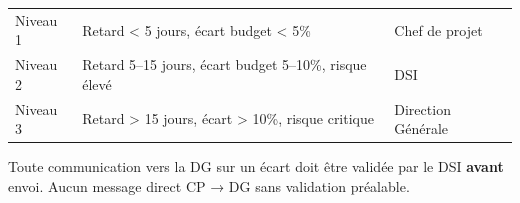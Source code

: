 \documentclass[11pt,a4paper,oneside]{report}
\begin{document}
\renewcommand{\arraystretch}{1.3}
\begin{tabularx}{\textwidth}{L{3cm} Y L{4cm}}
\toprule
{} &  &  \\
\midrule
Niveau 1 & Retard \textless{} 5 jours, écart budget \textless{} 5\% & Chef de projet \\
Niveau 2 & Retard 5–15 jours, écart budget 5–10\%, risque élevé & DSI \\
Niveau 3 & Retard \textgreater{} 15 jours, écart \textgreater{} 10\%, risque critique & Direction Générale \\
\bottomrule
\end{tabularx}

\begin{alert}
Toute communication vers la DG sur un écart doit être validée par le DSI \textbf{avant} envoi. Aucun message direct CP → DG sans validation préalable.
\end{alert}
\end{document}
